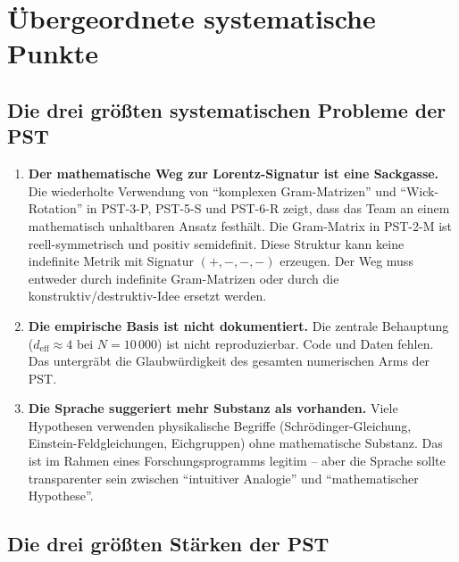 \documentclass[11pt,a4paper]{article}
\begin{document}
\newpage

\section{\"{U}bergeordnete systematische Punkte}

\subsection{Die drei gr\"{o}\ss{}ten systematischen Probleme der PST}

\begin{enumerate}
  \item \textbf{Der mathematische Weg zur Lorentz-Signatur ist eine
    Sackgasse.} Die wiederholte Verwendung von ``komplexen
    Gram-Matrizen'' und ``Wick-Rotation'' in PST-3-P, PST-5-S und
    PST-6-R zeigt, dass das Team an einem mathematisch unhaltbaren
    Ansatz festh\"{a}lt. Die Gram-Matrix in PST-2-M ist
    reell-symmetrisch und positiv semidefinit. Diese Struktur kann
    keine indefinite Metrik mit Signatur $(+,-,-,-)$ erzeugen. Der
    Weg muss entweder durch indefinite Gram-Matrizen oder durch die
    konstruktiv/destruktiv-Idee ersetzt werden.

  \item \textbf{Die empirische Basis ist nicht dokumentiert.} Die
    zentrale Behauptung ($d_{\text{eff}} \approx 4$ bei $N = 10\,000$)
    ist nicht reproduzierbar. Code und Daten fehlen. Das untergr\"{a}bt
    die Glaubw\"{u}rdigkeit des gesamten numerischen Arms der PST.

  \item \textbf{Die Sprache suggeriert mehr Substanz als vorhanden.}
    Viele Hypothesen verwenden physikalische Begriffe
    (Schr\"{o}dinger-Gleichung, Einstein-Feldgleichungen,
    Eichgruppen) ohne mathematische Substanz. Das ist im Rahmen eines
    Forschungsprogramms legitim -- aber die Sprache sollte
    transparenter sein zwischen ``intuitiver Analogie'' und
    ``mathematischer Hypothese''.
\end{enumerate}

\subsection{Die drei gr\"{o}\ss{}ten St\"{a}rken der PST}
\end{document}
